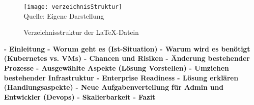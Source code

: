 \begin{figure}[H]
\caption{Verzeichnisstruktur der \LaTeX{}-Datein}\label{fig:verzeichnisStruktur}
\texttt{[image: verzeichnisStruktur]}
\\
Quelle: Eigene Darstellung
\end{figure}

\textbf{
  - Einleitung
  - Worum geht es (Ist-Situation)
  - Warum wird es benötigt (Kubernetes vs. VMs)
  - Chancen und Risiken
  - Änderung bestehender Prozesse
  - Ausgewählte Aspekte (Lösung Vorstellen)
  - Umziehen bestehender Infrastruktur
  - Enterprise Readiness
  - Lösung erklären (Handlungsaspekte)
  - Neue Aufgabenverteilung für Admin und Entwickler (Devops)
  - Skalierbarkeit
  - Fazit 
  }